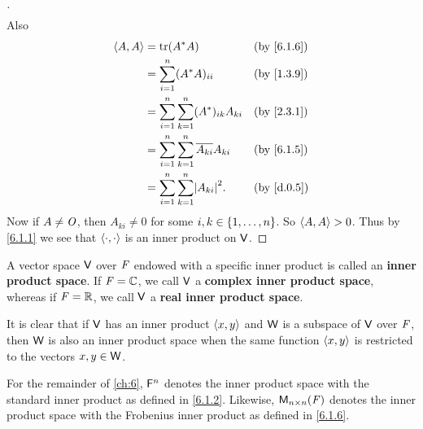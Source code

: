 \begin{proof}[]
\begin{align*}
  \end{align*}
  Also
  \begin{align*}
    \inn{A, A} & = \tr(A^* A)                                           &  & \text{(by \cref{6.1.6})} \\
               & = \sum_{i = 1}^n (A^* A)_{i i}                         &  & \text{(by \cref{1.3.9})} \\
               & = \sum_{i = 1}^n \sum_{k = 1}^n (A^*)_{i k} A_{k i}    &  & \text{(by \cref{2.3.1})} \\
               & = \sum_{i = 1}^n \sum_{k = 1}^n \conj{A_{k i}} A_{k i} &  & \text{(by \cref{6.1.5})} \\
               & = \sum_{i = 1}^n \sum_{k = 1}^n \abs{A_{k i}}^2.       &  & \text{(by \cref{d.0.5})}
  \end{align*}
  Now if \(A \neq \mathit{O}\), then \(A_{k i} \neq 0\) for some \(i, k \in \left\lbrace1, \dots, n\right\rbrace\).
  So \(\left\langle A, A\right\rangle > 0\).
  Thus by \cref{6.1.1} we see that \(\left\langle\cdot, \cdot\right\rangle\) is an inner product on \(\mathsf{V}\).
\end{proof}

\begin{defn}\label{6.1.7}
  A vector space \(\mathsf{V}\) over \(\mathit{F}\) endowed with a specific inner product is called an \textbf{inner product space}.
  If \(\mathit{F} = \mathbb{C}\), we call \(\mathsf{V}\) a \textbf{complex inner product space}, whereas if \(\mathit{F} = \mathbb{R}\), we call \(\mathsf{V}\) a \textbf{real inner product space}.

  It is clear that if \(\mathsf{V}\) has an inner product \(\left\langle x, y\right\rangle\) and \(\mathsf{W}\) is a subspace of \(\mathsf{V}\) over \(\mathit{F}\), then \(\mathsf{W}\) is also an inner product space when the same function \(\left\langle x, y\right\rangle\) is restricted to the vectors \(x, y \in \mathsf{W}\).
\end{defn}

\begin{note}
  For the remainder of \cref{ch:6}, \(\mathsf{F}^n\) denotes the inner product space with the standard inner product as defined in \cref{6.1.2}.
  Likewise, \(\mathsf{M}_{{n} \times n}({\mathit{F}})\) denotes the inner product space with the Frobenius inner product as defined in \cref{6.1.6}.
\end{note}

\exercisesection

\begin{ex}\label{ex:6.1.15}

\end{ex}
